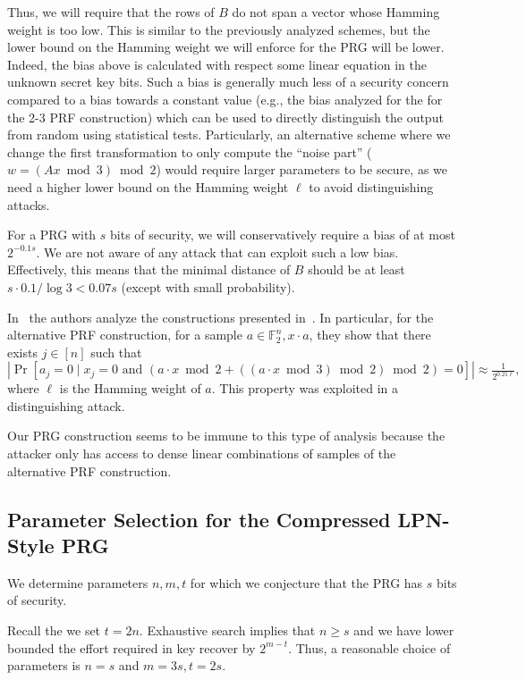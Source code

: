 \documentclass[orivec,envcountsect]{llncs}
\begin{document}
Thus, we will require
that the rows of $B$ do not span a vector whose Hamming weight is too low.
This is similar to the previously analyzed schemes,
but the lower bound on the Hamming weight we will enforce for the PRG will be lower.
Indeed, the bias above is calculated with respect some linear equation in the unknown secret key bits.
Such a bias is generally much less of a security concern compared to a bias towards a constant value
(e.g., the bias analyzed for the for the 2-3 PRF construction) which can be used
to directly distinguish the output from random using statistical tests.
Particularly, an alternative scheme where we change the first transformation
to only compute the ``noise part''
($w =(Ax \bmod 3) \bmod 2$) would require larger parameters to be secure,
as we need a higher lower bound on the Hamming weight $\ell$ to avoid distinguishing attacks.

For a PRG with $s$ bits of security, we will conservatively require a bias of at most $2^{-0.1 s}$.
We are not aware of any attack that can exploit such a low bias.
Effectively, this means that the minimal distance of $B$ should be
at least $s \cdot 0.1/\log 3 < 0.07 s$ (except with small probability).


\begin{remark}
In~\cite{CheonCKK20} the authors analyze the constructions presented in~\cite{BonehIPSW18}.
In particular, for the alternative PRF construction,
for a sample $a \in \mathbb{F}_2^n, x \cdot a$,
they show that there exists $j \in [n]$ such that
$$|\Pr[a_j = 0 \mid x_j = 0 \text{ and } (a \cdot x \bmod 2 + ((a \cdot x \bmod 3) \bmod 2) \bmod 2) = 0]| \approx \tfrac{1}{2^{0.21 \ell}},$$
where $\ell$ is the Hamming weight of $a$.
This property was exploited in a distinguishing attack.

Our PRG construction seems to be immune to this type of analysis
because the attacker only has access to dense linear combinations of samples
of the alternative PRF construction.
\end{remark}


\subsection{Parameter Selection for the Compressed LPN-Style PRG}

We determine parameters $n,m,t$ for which
we conjecture that the
PRG has $s$ bits of security.

Recall the we set $t = 2n$.
Exhaustive search implies that $n \geq s$ and we have lower
bounded the effort required in key recover by $2^{m - t}$.
Thus, a reasonable choice of parameters is $n = s$ and $m = 3s, t = 2s$.
\end{document}

